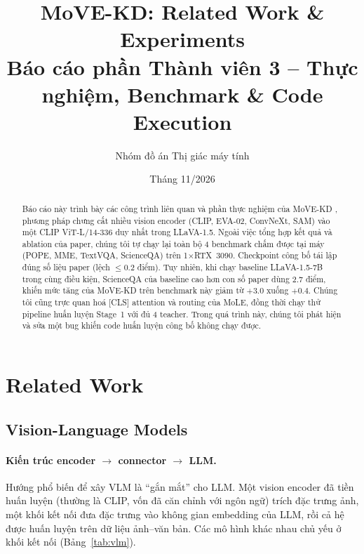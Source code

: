 \documentclass[11pt,a4paper]{article}
\title{\textbf{MoVE-KD: Related Work \& Experiments}\\[4pt]
\large Báo cáo phần Thành viên 3 -- Thực nghiệm, Benchmark \& Code Execution}
\author{Nhóm đồ án Thị giác máy tính}
\date{Tháng 11/2026}
\begin{document}
\maketitle

\begin{abstract}
Báo cáo này trình bày các công trình liên quan và phần thực nghiệm của MoVE-KD \cite{movekd}, phương pháp chưng cất nhiều vision encoder (CLIP, EVA-02, ConvNeXt, SAM) vào một CLIP ViT-L/14-336 duy nhất trong LLaVA-1.5. Ngoài việc tổng hợp kết quả và ablation của paper, chúng tôi tự chạy lại toàn bộ 4 benchmark chấm được tại máy (POPE, MME, TextVQA, ScienceQA) trên 1$\times$RTX~3090. Checkpoint công bố tái lập đúng số liệu paper (lệch $\le 0.2$ điểm). Tuy nhiên, khi chạy baseline LLaVA-1.5-7B trong cùng điều kiện, ScienceQA của baseline cao hơn con số paper dùng 2.7 điểm, khiến mức tăng của MoVE-KD trên benchmark này giảm từ $+3.0$ xuống $+0.4$. Chúng tôi cũng trực quan hoá [CLS] attention và routing của MoLE, đồng thời chạy thử pipeline huấn luyện Stage~1 với đủ 4 teacher. Trong quá trình này, chúng tôi phát hiện và sửa một bug khiến code huấn luyện công bố không chạy được.
\end{abstract}

\tableofcontents
\newpage

\section{Related Work}

\subsection{Vision-Language Models}

\paragraph{Kiến trúc encoder $\rightarrow$ connector $\rightarrow$ LLM.} Hướng phổ biến để xây VLM là ``gắn mắt'' cho LLM. Một vision encoder đã tiền huấn luyện (thường là CLIP, vốn đã căn chỉnh với ngôn ngữ) trích đặc trưng ảnh, một khối kết nối đưa đặc trưng vào không gian embedding của LLM, rồi cả hệ được huấn luyện trên dữ liệu ảnh--văn bản. Các mô hình khác nhau chủ yếu ở khối kết nối (Bảng~\ref{tab:vlm}).
\end{document}
